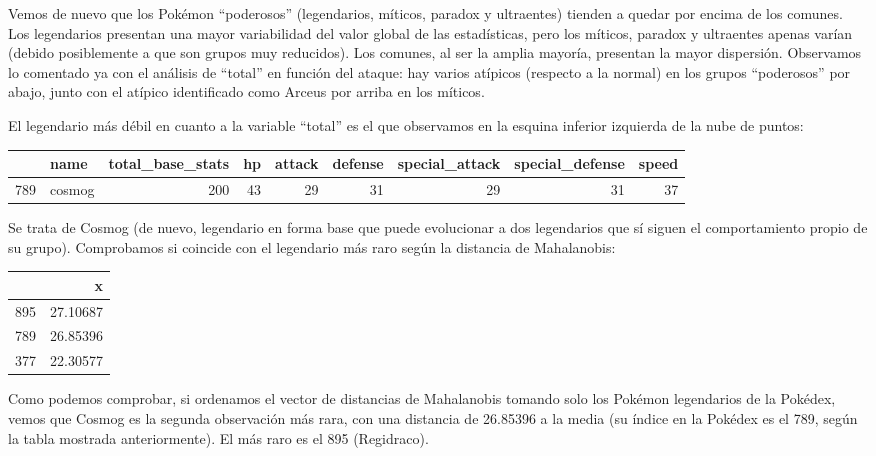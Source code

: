 \documentclass[
  11.8pt,
]{extreport}
\begin{document}
Vemos de nuevo que los Pokémon ``poderosos'' (legendarios, míticos,
paradox y ultraentes) tienden a quedar por encima de los comunes. Los
legendarios presentan una mayor variabilidad del valor global de las
estadísticas, pero los míticos, paradox y ultraentes apenas varían
(debido posiblemente a que son grupos muy reducidos). Los comunes, al
ser la amplia mayoría, presentan la mayor dispersión. Observamos lo
comentado ya con el análisis de ``total'' en función del ataque: hay
varios atípicos (respecto a la normal) en los grupos ``poderosos'' por
abajo, junto con el atípico identificado como Arceus por arriba en los
míticos.

El legendario más débil en cuanto a la variable ``total'' es el que
observamos en la esquina inferior izquierda de la nube de puntos:

\begin{table}[H]
\centering\begingroup\fontsize{9.5}{11.5}\selectfont

\begin{tabular}{llrrrrrrr}
\toprule
  & name & total\_base\_stats & hp & attack & defense & special\_attack & special\_defense & speed\\
\midrule
789 & cosmog & 200 & 43 & 29 & 31 & 29 & 31 & 37\\
\bottomrule
\end{tabular}
\endgroup{}
\end{table}

Se trata de Cosmog (de nuevo, legendario en forma base que puede
evolucionar a dos legendarios que sí siguen el comportamiento propio de
su grupo). Comprobamos si coincide con el legendario más raro según la
distancia de Mahalanobis:

\begin{table}[H]
\centering\begingroup\fontsize{9.5}{11.5}\selectfont

\begin{tabular}{lr}
\toprule
  & x\\
\midrule
895 & 27.10687\\
789 & 26.85396\\
377 & 22.30577\\
\bottomrule
\end{tabular}
\endgroup{}
\end{table}

Como podemos comprobar, si ordenamos el vector de distancias de
Mahalanobis tomando solo los Pokémon legendarios de la Pokédex, vemos
que Cosmog es la segunda observación más rara, con una distancia de
26.85396 a la media (su índice en la Pokédex es el 789, según la tabla
mostrada anteriormente). El más raro es el 895 (Regidraco).
\end{document}
